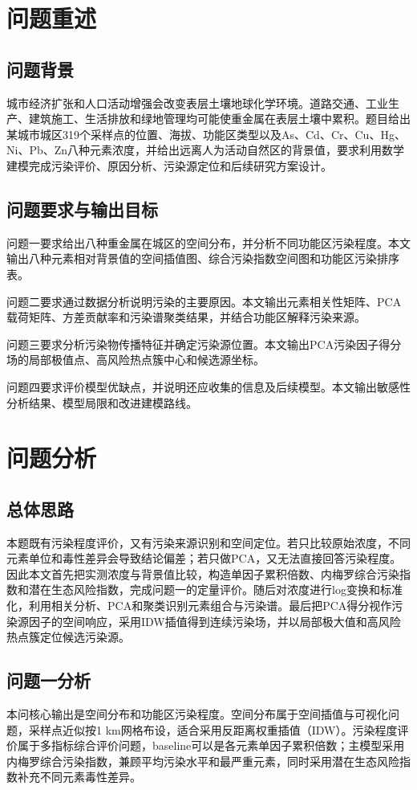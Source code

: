 \documentclass[UTF8,a4paper,12pt]{ctexart}
\begin{document}
\section{问题重述}
\subsection{问题背景}
城市经济扩张和人口活动增强会改变表层土壤地球化学环境。道路交通、工业生产、建筑施工、生活排放和绿地管理均可能使重金属在表层土壤中累积。题目给出某城市城区319个采样点的位置、海拔、功能区类型以及As、Cd、Cr、Cu、Hg、Ni、Pb、Zn八种元素浓度，并给出远离人为活动自然区的背景值，要求利用数学建模完成污染评价、原因分析、污染源定位和后续研究方案设计。

\subsection{问题要求与输出目标}
问题一要求给出八种重金属在城区的空间分布，并分析不同功能区污染程度。本文输出八种元素相对背景值的空间插值图、综合污染指数空间图和功能区污染排序表。

问题二要求通过数据分析说明污染的主要原因。本文输出元素相关性矩阵、PCA载荷矩阵、方差贡献率和污染谱聚类结果，并结合功能区解释污染来源。

问题三要求分析污染物传播特征并确定污染源位置。本文输出PCA污染因子得分场的局部极值点、高风险热点簇中心和候选源坐标。

问题四要求评价模型优缺点，并说明还应收集的信息及后续模型。本文输出敏感性分析结果、模型局限和改进建模路线。

\section{问题分析}
\subsection{总体思路}
本题既有污染程度评价，又有污染来源识别和空间定位。若只比较原始浓度，不同元素单位和毒性差异会导致结论偏差；若只做PCA，又无法直接回答污染程度。因此本文首先把实测浓度与背景值比较，构造单因子累积倍数、内梅罗综合污染指数和潜在生态风险指数，完成问题一的定量评价。随后对浓度进行log变换和标准化，利用相关分析、PCA和聚类识别元素组合与污染谱。最后把PCA得分视作污染源因子的空间响应，采用IDW插值得到连续污染场，并以局部极大值和高风险热点簇定位候选污染源。

\subsection{问题一分析}
本问核心输出是空间分布和功能区污染程度。空间分布属于空间插值与可视化问题，采样点近似按1 km网格布设，适合采用反距离权重插值（IDW）。污染程度评价属于多指标综合评价问题，baseline可以是各元素单因子累积倍数；主模型采用内梅罗综合污染指数，兼顾平均污染水平和最严重元素，同时采用潜在生态风险指数补充不同元素毒性差异。
\end{document}
